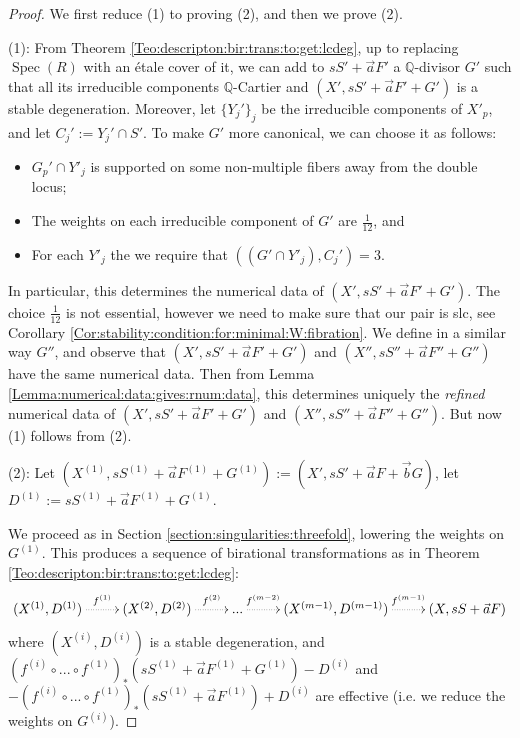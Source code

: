 \documentclass[11pt]{amsart}
\newcommand{\spec}{\operatorname{Spec}}
\theoremstyle{definition}
\begin{document}
\begin{proof}We first reduce (1) to proving (2), and then we prove (2).

(1): 
From Theorem \ref{Teo:descripton:bir:trans:to:get:lcdeg}, up to replacing $\spec(R)$ with an \'etale cover of it,
we can add to $sS'+\vec{a}F'$ a $\mathbb{Q}$-divisor $G'$ such that all its irreducible components
$\mathbb{Q}$-Cartier and $(X',sS'+\vec{a}F'+G')$ is a stable degeneration. Moreover, let $\{Y_j'\}_j$ be the irreducible components of $X'_p$, and let $C_j':=Y_j' \cap S'$. To make $G'$ more canonical, we can choose it as follows:
\begin{itemize}
\item $G_p' \cap Y'_j$ is supported on some non-multiple fibers away from the double locus;
\item The weights on each irreducible component of $G'$ are $\frac{1}{12}$, and 
\item For each $Y'_j$
the we require that $((G'\cap Y'_j),C_j')=3$. 
\end{itemize}
In particular, this determines the numerical data of $(X',sS'+\vec{a}F'+G')$.
The choice $\frac{1}{12}$ is not essential, however we need to make sure that our pair is slc, see Corollary \ref{Cor:stability:condition:for:minimal:W:fibration}.
We define in a similar way $G''$, and observe that $(X',sS'+\vec{a}F'+G')$ and $(X'',sS''+\vec{a}F''+G'')$ have the same numerical data.
 Then from Lemma \ref{Lemma:numerical:data:gives:rnum:data}, this determines uniquely the \emph{refined} numerical data of $(X',sS'+\vec{a}F'+G')$ and $(X'',sS''+\vec{a}F''+G'')$.
But now (1) follows from (2).

(2): Let $(X^{(1)},sS^{(1)}+\vec{a}F^{(1)}+G^{(1)}):=(X',sS'+\vec{a}F+\vec{b}G)$, let $D^{(1)}:= sS^{(1)}+\vec{a}F^{(1)}+G^{(1)}$.

We proceed as in Section \ref{section:singularities:threefold}, lowering the weights on $G^{(1)}$. This produces
a sequence of birational transformations
as in Theorem \ref{Teo:descripton:bir:trans:to:get:lcdeg}:
 $$\xymatrix{\ar @{} [r]
 (X^{(1)},D^{(1)}) \ar@{.>}^{f^{(1)}}[r] &(X^{(2)},D^{(2)}) \ar@{.>}^-{f^{(2)}}[r]&\text{...} \ar@{.>}^-{f^{(m-2)}}[r]
 &(X^{(m-1)},D^{(m-1)}) \ar@{.>}^-{f^{(m-1)}}[r] & (X,sS+\vec{a}F)}$$
 where $(X^{(i)},D^{(i)})$ is a stable degeneration, and $(f^{(i)} \circ... \circ f^{(1)})_*( sS^{(1)}+\vec{a}F^{(1)}+G^{(1)})-D^{(i)}$ and
 $-(f^{(i)} \circ... \circ f^{(1)})_*( sS^{(1)}+\vec{a}F^{(1)})+D^{(i)}$ are effective (i.e. we reduce the weights on $G^{(i)}$).


\end{proof}
\end{document}
